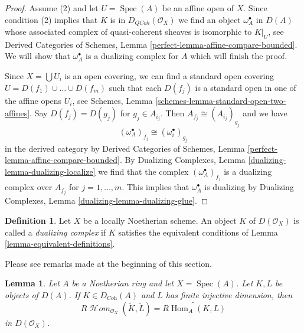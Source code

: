 \documentclass{stacks-project}
\theoremstyle{plain}
\newtheorem{lemma}[subsection]{Lemma}
\theoremstyle{definition}
\newtheorem{definition}[subsection]{Definition}
\theoremstyle{remark}
\numberwithin{equation}{subsection}
\def\Spec{\mathop{\mathrm{Spec}}}
\def\Hom{\mathop{\mathrm{Hom}}\nolimits}
\def\SheafHom{\mathop{\mathcal{H}\!\mathit{om}}\nolimits}
\def\QCoh{\mathit{QCoh}}
\begin{document}
\begin{proof}
Assume (2) and let $U = \Spec(A)$ be an affine open of $X$.
Since condition (2) implies that $K$ is in $D_\QCoh(\mathcal{O}_X)$
we find an object $\omega_A^\bullet$ in $D(A)$ whose associated
complex of quasi-coherent sheaves is isomorphic to $K|_U$, see
Derived Categories of Schemes, Lemma
\ref{perfect-lemma-affine-compare-bounded}.
We will show that $\omega_A^\bullet$ is a dualizing complex for $A$
which will finish the proof.

\medskip\noindent
Since $X = \bigcup U_i$ is an open covering, we can find a standard
open covering $U = D(f_1) \cup \ldots \cup D(f_m)$ such that
each $D(f_j)$ is a standard open in one of the affine opens $U_i$, see
Schemes, Lemma \ref{schemes-lemma-standard-open-two-affines}.
Say $D(f_j) = D(g_j)$ for $g_j \in A_{i_j}$.
Then $A_{f_j} \cong (A_{i_j})_{g_j}$ and we have
$$
(\omega_A^\bullet)_{f_j} \cong (\omega_i^\bullet)_{g_j}
$$
in the derived category by
Derived Categories of Schemes, Lemma
\ref{perfect-lemma-affine-compare-bounded}.
By Dualizing Complexes, Lemma \ref{dualizing-lemma-dualizing-localize}
we find that
the complex $(\omega_A^\bullet)_{f_j}$ is a dualizing complex over
$A_{f_j}$ for $j = 1, \ldots, m$. This implies that $\omega_A^\bullet$
is dualizing by
Dualizing Complexes, Lemma \ref{dualizing-lemma-dualizing-glue}.
\end{proof}

\begin{definition}
\label{definition-dualizing-scheme}
Let $X$ be a locally Noetherian scheme. An object $K$ of
$D(\mathcal{O}_X)$ is called a {\it dualizing complex} if
$K$ satisfies the equivalent conditions of
Lemma \ref{lemma-equivalent-definitions}.
\end{definition}

\noindent
Please see remarks made at the beginning of this section.

\begin{lemma}
\label{lemma-affine-duality}
Let $A$ be a Noetherian ring and let $X = \Spec(A)$. Let $K, L$ be objects
of $D(A)$. If $K \in D_{\textit{Coh}}(A)$ and $L$ has finite injective
dimension, then
$$
R\SheafHom_{\mathcal{O}_X}(\widetilde{K}, \widetilde{L})
=
\widetilde{R\Hom_A(K, L)}
$$
in $D(\mathcal{O}_X)$.
\end{lemma}
\end{document}
